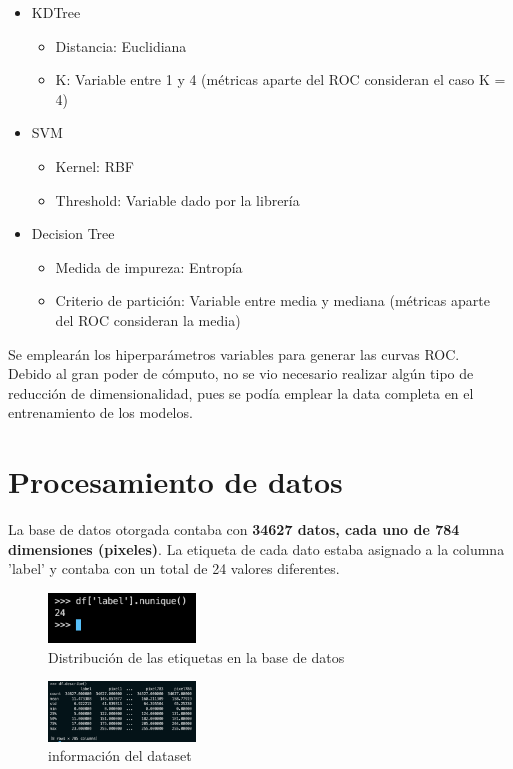\documentclass[conference]{IEEEtran}
\begin{document}
\begin{itemize}
  \item KDTree
\begin{itemize}
  \item Distancia: Euclidiana
  \item K: Variable entre 1 y 4 (métricas aparte del ROC consideran el caso K = 4)
\end{itemize}

\item SVM
\begin{itemize}
  \item Kernel: RBF
  \item Threshold: Variable dado por la librería
\end{itemize}

\item Decision Tree
\begin{itemize}
  \item Medida de impureza: Entropía
  \item Criterio de partición: Variable entre media y mediana (métricas aparte del ROC
    consideran la media)
\end{itemize}
\end{itemize}

Se emplearán los hiperparámetros variables para generar las curvas ROC. \\
Debido al gran poder de cómputo, no se vio necesario realizar algún tipo de
reducción de dimensionalidad, pues se podía emplear la data completa
en el entrenamiento de los modelos.

\section{Procesamiento de datos}
La base de datos otorgada contaba con \textbf{34627 datos, cada uno de 784 dimensiones (pixeles)}.
La etiqueta de cada dato estaba asignado a la columna 'label' y contaba con un total de 24 valores diferentes.

\begin{figure}[ht]
    \centering
    \includegraphics[width=0.35\textwidth]{images/label.png}
    \caption{Distribución de las etiquetas en la base de datos}
    \label{fig:dataset_label}
\end{figure}
\begin{figure}[ht]
    \centering
    \includegraphics[width=0.35\textwidth]{images/dataset.png}
    \caption{información del dataset}
    \label{fig:dataset_general}
\end{figure}
\end{document}

